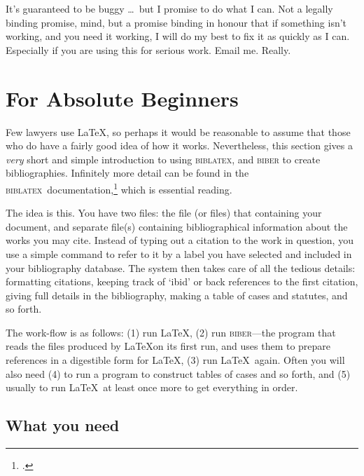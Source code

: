 \documentclass[a4paper,
               11pt,
	       DIV=1,			   
	       footinclude=false]
	      {scrartcl}
\newcommand{\biblatex}{\textsc{biblatex}}
\begin{document}
It's guaranteed to be buggy \ldots\ but I promise to do what I
can. Not a legally binding promise, mind, but a promise binding in
honour that if something isn't working, and you need it working, I
will do my best to fix it as quickly as I can. Especially if you are
using this for serious work. Email
me. Really.

\section{For Absolute Beginners}

Few lawyers use \LaTeX,
so perhaps it would be reasonable to assume that those who do have a
fairly good idea of how it works. Nevertheless, this section gives a
\emph{very} short and simple introduction to using \biblatex, and
\textsc{biber} to create bibliographies. Infinitely more detail can be
found in the \biblatex\ documentation,\footcite{biblatex2} which is
essential reading.

The idea is this. You have two files: the file (or files) that
containing your document, and separate file(s) containing
bibliographical information about the works you may cite. Instead of
typing out a citation to the work in question, you use a simple
command to refer to it by a label you have selected and included in
your bibliography database. The system then takes care of all the
tedious details: formatting citations, keeping track of `ibid' or back
references to the first citation, giving full details in the
bibliography, making a table of cases and statutes, and so forth.

The work-flow is as follows: (1)
run \LaTeX, (2) run \textsc{biber}---the program that reads the files
produced by \LaTeX on its first run, and uses them to prepare
references in a digestible form for \LaTeX, (3) run \LaTeX\
again. Often you will also need (4) to run a program to construct
tables of cases and so forth, and (5) usually to run \LaTeX\ at least
once more to get everything in
order.

\subsection{What you need}
\end{document}
